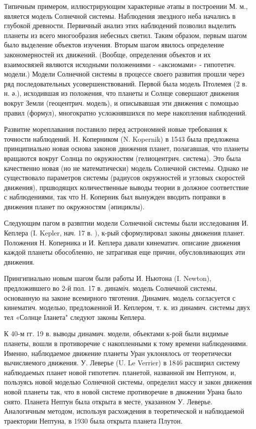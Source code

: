 \documentclass[10pt]{article}
\begin{document}
Типичным примером, иллюстрирующим характерные әтапы в построении М. м., является модель Солнечной системы. Наблюдения звездного неба начались в глубокой древности. Первичный анализ этих наблюдений позволил выделить планеты из всего многообразия небесных светил. Таким образом, первым шагом было выделение объектов изучения. Вторым шагом явилось определение закономерностей их движений. (Вообще, определения объектов и их взаимосвязей являются исходными положениями - «аксиомами» - гипотетич. модели.) Модели Солнечной системы в процессе своего развития прошли через ряд последовательных усовершенствований. Первой была модель Птолемея (2 в. н. ә.), исходившая из положения, что планеты и Солнце совершают движения вокруг Земли (геоцентрич. модель), и описывавшая эти движения с помощью правил (формул), многократно усложнявшихся по мере накопления наблюдений.



Развитие мореплавания поставило перед астрономией новые требования к точности наблюдений. Н. Коперником (N. Kopernik) в 1543 была предложена принципиально новая основа законов движения планет, полагавшая, что планеты вращаются вокруг Солнца по окружностям (гелиоцентрич. система). Это была качественно новая (но не математически) модель Солнечной системы. Однако не существовало параметров системы (радиусов окружностей и угловых скоростей движения), пршводящих количественные выводы теории в должное соответствие с наблюдениями, так что Н. Коперник был вынужден вводить поправки в движения планет по окружностям (әпициклы).



Следующим пагом в развптии модели Солнечной системы были исследования И. Кеплера (I. Kepler, нач. 17 в. ), к-рый сформулировал законы движения планет. Положения Н. Коперника и И. Кеплера давали кинематич. описание движения каждой планеты обособленно, не затрагивая еще причин, обусловливающих әти движения.



Прингипиально новым шагом были работы И. Ньютона (I. Newton), предложившего во 2-й пол. 17 в. динаміч. модель Солнечной системы, основанную на законе всемирного тяготения. Динамич. модель согласуется с кинематич. моделью, предложенной И. Кеплером, т. к. из динамич. системы двух тел «Солнце Іланета" следуют законы Кеплера.



К 40-м гг. 19 в. выводы динамич. модели, объектами к-рой были видимые планеты, вошли в противоречие с накопленными к тому времени наблюдениями. Именно, наблюдаемое движение планеты Уран уклонялось от теоретически вычисляемого движения. У. Леверье (U. Le Verrier) в 1846 расширил систему наблюдаемых планет новой гипотетич. планетой, названной им Нептуном, и, пользуясь новой моделью Солнечной системы, определил массу и закон движения новой планеты так, что в новой системе противоречие в движении Урана было снято. Планета Нептун была открыта в месте, указанном У. Леверье. Аналогичным методом, используя расхождения в теоретической и наблюдаемой траектории Нептуна, в 1930 была открыта планета Плутон.
\end{document}
